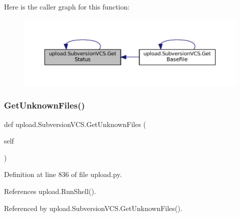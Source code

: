 Here is the caller graph for this function\+:
\nopagebreak
\begin{figure}[H]
\begin{center}
\leavevmode
\includegraphics[width=350pt]{classupload_1_1SubversionVCS_ac3785eb1fa561088206d01570f9fe982_icgraph}
\end{center}
\end{figure}
\mbox{\label{classupload_1_1SubversionVCS_a494ba1010992d83cac015bc396ab693a}} 
\subsubsection{\texorpdfstring{Get\+Unknown\+Files()}{GetUnknownFiles()}\hspace{0.1cm}{\footnotesize\ttfamily [1/2]}}
{\footnotesize\ttfamily def upload.\+Subversion\+V\+C\+S.\+Get\+Unknown\+Files (\begin{DoxyParamCaption}\item[{}]{self }\end{DoxyParamCaption})}



Definition at line 836 of file upload.\+py.



References upload.\+Run\+Shell().



Referenced by upload.\+Subversion\+V\+C\+S.\+Get\+Unknown\+Files().


